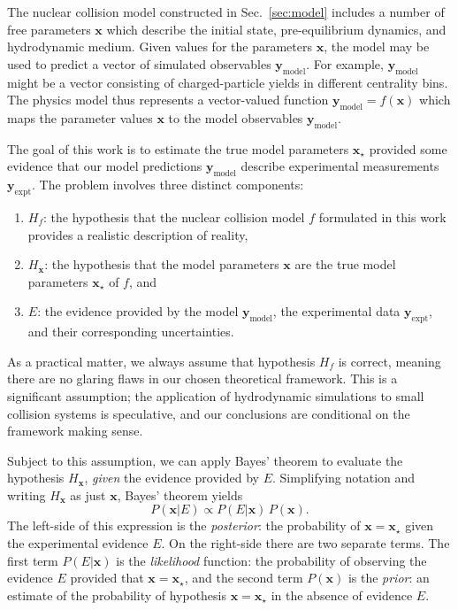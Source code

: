 \documentclass[aps,prc,reprint,amsmath,nofootinbib]{revtex4-1}
\newcommand{\xv}{\mathbf x}
\newcommand{\ym}{{\mathbf y}_\text{model}}
\newcommand{\ye}{{\mathbf y}_\text{expt}}
\begin{document}
The nuclear collision model constructed in Sec.~\ref{sec:model} includes a number of free parameters $\xv$ which describe the initial state, pre-equilibrium dynamics, and hydrodynamic medium.
Given values for the parameters $\xv$, the model may be used to predict a vector of simulated observables $\ym$.
For example, $\ym$ might be a vector consisting of charged-particle yields in different centrality bins.
The physics model thus represents a vector-valued function $\ym = f(\xv)$ which maps the parameter values $\xv$ to the model observables $\ym$.

The goal of this work is to estimate the true model parameters $\xv_\star$ provided some evidence that our model predictions $\ym$ describe experimental measurements $\ye$.
The problem involves three distinct components:
\begin{enumerate}[itemsep=0pt, leftmargin=2\parindent]
  \item
    $H_f$: the hypothesis that the nuclear collision model $f$ formulated in this work provides a realistic description of reality,
  \item
    $H_\xv$: the hypothesis that the model parameters $\xv$ are the true model parameters $\xv_\star$ of $f$, and
  \item
    $E$: the evidence provided by the model $\ym$, the experimental data $\ye$, and their corresponding uncertainties.
\end{enumerate}
As a practical matter, we always assume that hypothesis $H_f$ is correct, meaning there are no glaring flaws in our chosen theoretical framework.
This is a significant assumption; the application of hydrodynamic simulations to small collision systems is speculative, and our conclusions are conditional on the framework making sense.

Subject to this assumption, we can apply Bayes' theorem to evaluate the hypothesis $H_\xv$, \emph{given} the evidence provided by $E$.
Simplifying notation and writing $H_\xv$ as just $\xv$, Bayes' theorem yields
\begin{equation}
  \label{eq:bayes}
  P(\xv | E) \propto P(E | \xv)\, P(\xv).
\end{equation}
The left-side of this expression is the \emph{posterior}: the probability of $\xv = \xv_\star$ given the experimental evidence $E$.
On the right-side there are two separate terms.
The first term $P(E | \xv)$ is the \emph{likelihood} function: the probability of observing the evidence $E$ provided that $\xv = \xv_\star$, and the second term $P(\xv)$ is the \emph{prior}: an estimate of the probability of hypothesis $\xv = \xv_\star$ in the absence of evidence $E$.
\end{document}
